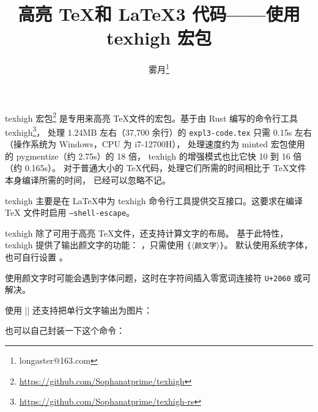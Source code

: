 \documentclass[zihao=-4,fontset=fandol]{ctexart}
\begin{document}
\title{高亮 \TeX 和 \LaTeX3 代码——使用\textsf{texhigh} 宏包}
\author{雾月\thanks{longaster@163.com}}
\maketitle

\textsf{texhigh} 宏包\footnote{\url{https://github.com/Sophanatprime/texhigh}}%
是专用来高亮 \TeX 文件的宏包。基于由 Rust 编写的命令行工具
texhigh\footnote{\url{https://github.com/Sophanatprime/texhigh-rs}}，
处理 1.24MB 左右（37,700 余行）的 \texttt{expl3-code.tex} 只需 0.15s 左右
（操作系统为 Windows，CPU 为 i7-12700H），
处理速度约为 \textsf{minted} 宏包使用的 pygmentize（约 2.75s）的 18 倍，
texhigh 的增强模式也比它快 10 到 16 倍（约 0.165s）。
对于普通大小的 \TeX 代码，处理它们所需的时间相比于 \TeX 文件本身编译所需的时间，
已经可以忽略不记。

\textsf{texhigh} 主要是在 \LaTeX 中为 texhigh 命令行工具提供交互接口。这要求在编译 \TeX
文件时启用 \texttt{--shell-escape}。

texhigh 除了可用于高亮 \TeX 文件，还支持计算文字的布局。
基于此特性，\textsf{texhigh} 提供了输出颜文字的功能：
 ，只需使用 \texhighverb{\kaomoji}\texttt\{\ensuremath{\langle}\verb|颜文字|\ensuremath{\rangle}\texttt\}。
默认使用系统字体，也可自行设置 。

\quad
{}\quad
{}\quad
{}\quad
{}

使用颜文字时可能会遇到字体问题，这时在字符间插入零宽词连接符 \texttt{U+2060} 或可解决。

使用 \texhighverb|\kaomoji*| 还支持把单行文字输出为图片：
\begin{examcode}[texhigh options={
  char-category*={emoji}{[\p{Emoji}--\p{ASCII}]}{\mbox{\emojifont #1}} %
}]{}

\end{examcode}

也可以自己封装一下这个命令：
\end{document}
